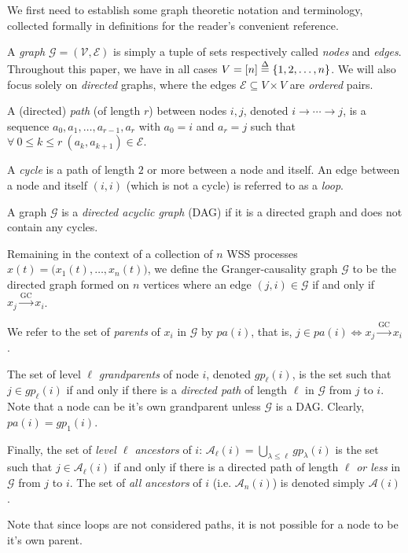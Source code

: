 \documentclass[12pt]{article}
\def\gc{\overset{\text{GC}}{\rightarrow}}  %
\def\gcg{\mathcal{G}}  %
\newcommand{\pa}[1]{pa(#1)}  %
\newcommand{\anc}[1]{\mathcal{A}(#1)}  %
\newcommand{\ancn}[2]{\mathcal{A}_{#1}(#2)}  %
\newcommand{\gpn}[2]{gp_{#1}(#2)}  %
\newcommand{\gcgpath}[2]{#1 \rightarrow \cdots \rightarrow #2}  %
\begin{document}
We first need to establish some graph theoretic notation and
terminology, collected formally in definitions for the reader's
convenient reference.

\begin{definition}
  A \textit{graph} $\gcg = (\mathcal{V}, \mathcal{E})$ is simply a
  tuple of sets respectively called \textit{nodes} and \textit{edges}.
  Throughout this paper, we have in all cases
  $V = [n] \overset{\Delta}{=} \{1, 2, \ldots, n\}$.  We will also focus solely on
  \textit{directed} graphs, where the edges
  $\mathcal{E} \subseteq V \times V$ are \textit{ordered} pairs.

  A (directed) \textit{path} (of length $r$) between nodes $i, j$,
  denoted $\gcgpath{i}{j}$, is a sequence
  $a_0, a_1, \ldots, a_{r - 1}, a_r$ with $a_0 = i$ and $a_r = j$ such
  that $\forall\ 0 \le k \le r\ (a_k, a_{k + 1}) \in \mathcal{E}$.

  A \textit{cycle} is a path of length $2$ or more between a node and
  itself.  An edge between a node and itself $(i, i)$ (which is not a
  cycle) is referred to as a \textit{loop}.

  A graph $\gcg$ is a \textit{directed acyclic graph} (DAG) if it is a
  directed graph and does not contain any cycles.
\end{definition}

\begin{definition}

Remaining in the context of a collection of $n$ WSS processes
$x(t) = \big(x_1(t), \ldots, x_n(t)\big)$, we define the Granger-causality
graph $\gcg$ to be the directed graph formed on $n$ vertices where an
edge $(j, i) \in \gcg$ if and only if $x_j \gc x_i$.

We refer to the set of \textit{parents} of $x_i$ in $\gcg$ by
$\pa{i}$, that is, $j \in \pa{i} \iff x_j \gc x_i$.
\end{definition}

\begin{definition}
  The set of level $\ell$ \textit{grandparents} of node $i$, denoted
  $\gpn{\ell}{i}$, is the set such that $j \in \gpn{\ell}{i}$ if and
  only if there is a \textit{directed path} of length $\ell$ in $\gcg$
  from $j$ to $i$.  Note that a node can be it's own grandparent
  unless $\gcg$ is a DAG.  Clearly, $\pa{i} = \gpn{1}{i}$.

  Finally, the set of \textit{level $\ell$ ancestors} of $i$:
  $\ancn{\ell}{i} = \bigcup_{\lambda \le \ell}\gpn{\lambda}{i}$ is the
  set such that $j \in \ancn{\ell}{i}$ if and only if there is a
  directed path of length $\ell$ \textit{or less} in $\gcg$ from $j$
  to $i$.  The set of \textit{all ancestors} of $i$
  (i.e. $\ancn{n}{i}$) is denoted simply $\anc{i}$.

  Note that since loops are not considered paths, it is not possible
  for a node to be it's own parent.
\end{definition}
\end{document}
